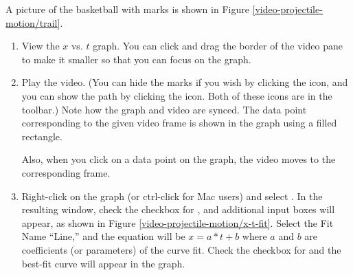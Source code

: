 \begin{enumerate}

	A picture of the basketball with marks is shown in Figure \ref{video-projectile-motion/trail}.
	

\end{enumerate}

\analysis

\begin{enumerate}
	\item View the $x$ vs. $t$ graph. You can click and drag the border of the video pane to make it smaller so that you can focus on the graph.
	
	\item Play the video. (You can hide the marks if you wish by clicking the  icon, and you can show the path by clicking the  icon. Both of these icons are in the toolbar.) Note how the graph and video are synced. The data point corresponding to the given video frame is shown in the graph using a filled rectangle.
	
	Also, when you click on a data point on the graph, the video moves to the corresponding frame.
		
	
	
					
	\item  Right-click on the graph (or ctrl-click for Mac users) and select . In the resulting window, check the checkbox for , and additional input boxes will appear, as shown in Figure \ref{video-projectile-motion/x-t-fit}. Select the Fit Name ``Line,'' and the equation will be $x=a*t+b$ where $a$ and $b$ are coefficients (or parameters) of the curve fit. Check the checkbox for  and the best-fit curve will appear in the graph.
	
	

\end{enumerate}
